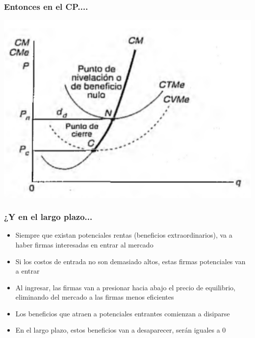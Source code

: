 \documentclass{beamer}
\begin{document}
\begin{frame}
\frametitle{Entonces en el CP....}
\centering
\includegraphics[scale=0.85]{Slides Principios de Economia/Figures/ZonasCP.png}
\end{frame}


\begin{frame}
\frametitle{¿Y en el largo plazo...}
\begin{itemize}
    \item Siempre que existan potenciales rentas (beneficios extraordinarios), va a haber firmas interesadas en entrar al mercado
    \item Si los costos de entrada no son demasiado altos, estas firmas potenciales van a entrar
    \item Al ingresar, las firmas van a presionar hacia abajo el precio de equilibrio, eliminando del mercado a las firmas menos eficientes
    \item Los beneficios que atraen a potenciales entrantes comienzan a disiparse
    \item En el largo plazo, estos beneficios van a desaparecer, serán iguales a 0
    \end{itemize}
\end{frame}
\end{document}
